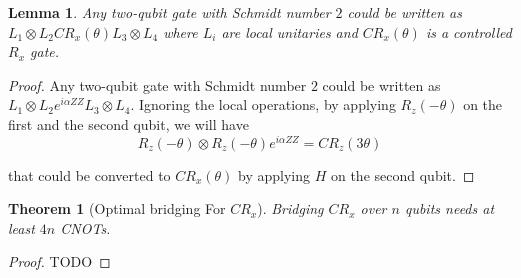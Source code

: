 \documentclass{report}
\newtheorem{theorem}{Theorem}
\newtheorem{lemma}{Lemma}
\begin{document}
\begin{lemma}
  Any two-qubit gate with Schmidt number $2$ could be written as $L_1 \otimes L_2 CR_x(\theta) L_3 \otimes L_4$ where $L_i$ are local unitaries and $CR_x(\theta)$ is a controlled $R_x$ gate.
  \label{lem:decomposition-schmidt-2}
\end{lemma}
\begin{proof}
  Any two-qubit gate with Schmidt number $2$ could be written as $L_1 \otimes L_2 e^{i\alpha ZZ} L_3 \otimes L_4$. 
  Ignoring the local operations, by applying $R_z(-\theta)$ on the first and the second qubit, we will have 
  \begin{equation}
    R_z(-\theta) \otimes R_z(-\theta) e^{i\alpha ZZ} = CR_z(3\theta)
  \end{equation}
  
  that could be converted to $CR_x(\theta)$ by applying $H$ on the second qubit.
\end{proof}

\begin{theorem}[Optimal bridging For $CR_x$]
  Bridging $CR_x$ over $n$ qubits needs at least $4n$ CNOTs.
  \label{thm:bridging-crx}
\end{theorem}
\begin{proof}
  TODO
\end{proof}
\end{document}
